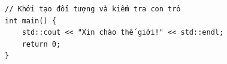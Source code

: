 \documentclass[12pt,a4paper]{article}
\begin{document}
\begin{lstlisting}
// Khởi tạo đối tượng và kiểm tra con trỏ
int main() {
    std::cout << "Xin chào thế giới!" << std::endl;
    return 0;
}
\end{lstlisting}
\end{document}
